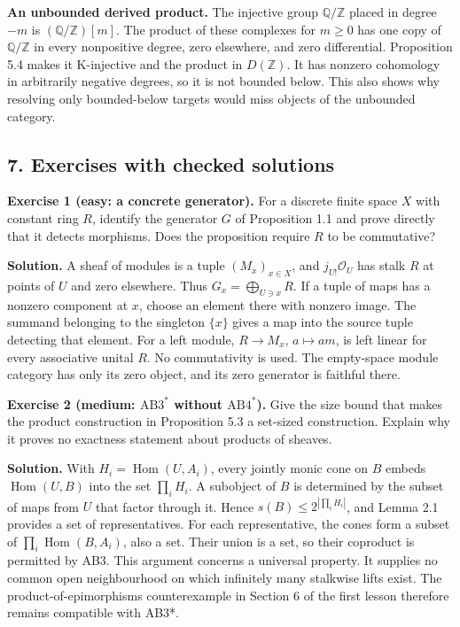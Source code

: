 \documentclass[
  english,
  11pt,
  a4paper,
]{article}
\begin{document}
\textbf{An unbounded derived product.} The injective group
\(\mathbb Q/\mathbb Z\) placed in degree \(-m\) is
\((\mathbb Q/\mathbb Z)[m]\). The product of these complexes for
\(m\ge0\) has one copy of \(\mathbb Q/\mathbb Z\) in every nonpositive
degree, zero elsewhere, and zero differential. Proposition 5.4 makes it
K-injective and the product in \(D(\mathbb Z)\). It has nonzero
cohomology in arbitrarily negative degrees, so it is not bounded below.
This also shows why resolving only bounded-below targets would miss
objects of the unbounded category.

\subsection{7. Exercises with checked
solutions}\label{k-injective-resolutions-in-grothendieck-categories--7-exercises-with-checked-solutions}

\textbf{Exercise 1 (easy: a concrete generator).} For a discrete finite
space \(X\) with constant ring \(R\), identify the generator \(G\) of
Proposition 1.1 and prove directly that it detects morphisms. Does the
proposition require \(R\) to be commutative?

\textbf{Solution.} A sheaf of modules is a tuple \((M_x)_{x\in X}\), and
\(j_{U!}\mathcal O_U\) has stalk \(R\) at points of \(U\) and zero
elsewhere. Thus \(G_x=\bigoplus_{U\ni x}R\). If a tuple of maps has a
nonzero component at \(x\), choose an element there with nonzero image.
The summand belonging to the singleton \(\{x\}\) gives a map into the
source tuple detecting that element. For a left module, \(R\to M_x\),
\(a\mapsto am\), is left linear for every associative unital \(R\). No
commutativity is used. The empty-space module category has only its zero
object, and its zero generator is faithful there.

\textbf{Exercise 2 (medium: \(\mathrm{AB3}^{*}\) without
\(\mathrm{AB4}^{*}\)).} Give the size bound that makes the product
construction in Proposition 5.3 a set-sized construction. Explain why it
proves no exactness statement about products of sheaves.

\textbf{Solution.} With \(H_i=\operatorname{Hom}(U,A_i)\), every jointly
monic cone on \(B\) embeds \(\operatorname{Hom}(U,B)\) into the set
\(\prod_i H_i\). A subobject of \(B\) is determined by the subset of
maps from \(U\) that factor through it. Hence
\(s(B)\le2^{|\prod_i H_i|}\), and Lemma 2.1 provides a set of
representatives. For each representative, the cones form a subset of
\(\prod_i\operatorname{Hom}(B,A_i)\), also a set. Their union is a set,
so their coproduct is permitted by AB3. This argument concerns a
universal property. It supplies no common open neighbourhood on which
infinitely many stalkwise lifts exist. The product-of-epimorphisms
counterexample in Section 6 of the first lesson therefore remains
compatible with AB3*.
\end{document}
